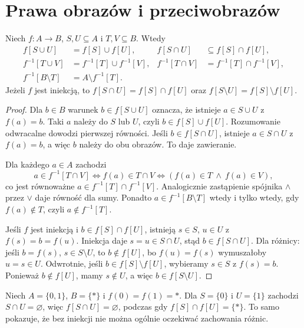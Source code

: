 \section{Prawa obrazów i przeciwobrazów}
\begin{twierdzenie}\label{thm:image-laws}
Niech $f:A\to B$, $S,U\subseteq A$ i $T,V\subseteq B$. Wtedy
\begin{align*}
f[S\cup U]&=f[S]\cup f[U], & f[S\cap U]&\subseteq f[S]\cap f[U],\\
f^{-1}[T\cup V]&=f^{-1}[T]\cup f^{-1}[V], &f^{-1}[T\cap V]&=f^{-1}[T]\cap f^{-1}[V],\\
f^{-1}[B\setminus T]&=A\setminus f^{-1}[T].
\end{align*}
Jeżeli $f$ jest iniekcją, to $f[S\cap U]=f[S]\cap f[U]$ oraz $f[S\setminus U]=f[S]\setminus f[U]$.
\end{twierdzenie}
\begin{proof}
Dla $b\in B$ warunek $b\in f[S\cup U]$ oznacza, że istnieje $a\in S\cup U$ z $f(a)=b$. Taki $a$ należy do $S$ lub $U$, czyli $b\in f[S]\cup f[U]$. Rozumowanie odwracalne dowodzi pierwszej równości. Jeśli $b\in f[S\cap U]$, istnieje $a\in S\cap U$ z $f(a)=b$, a więc $b$ należy do obu obrazów. To daje zawieranie.

Dla każdego $a\in A$ zachodzi
\[
a\in f^{-1}[T\cap V]\iff f(a)\in T\cap V\iff (f(a)\in T\ \land\ f(a)\in V),
\]
co jest równoważne $a\in f^{-1}[T]\cap f^{-1}[V]$. Analogicznie zastąpienie spójnika $\land$ przez $\lor$ daje równość dla sumy. Ponadto $a\in f^{-1}[B\setminus T]$ wtedy i tylko wtedy, gdy $f(a)\notin T$, czyli $a\notin f^{-1}[T]$.

Jeśli $f$ jest iniekcją i $b\in f[S]\cap f[U]$, istnieją $s\in S$, $u\in U$ z $f(s)=b=f(u)$. Iniekcja daje $s=u\in S\cap U$, stąd $b\in f[S\cap U]$. Dla różnicy: jeśli $b=f(s)$, $s\in S\setminus U$, to $b\notin f[U]$, bo $f(u)=f(s)$ wymuszałoby $u=s\in U$. Odwrotnie, jeśli $b\in f[S]\setminus f[U]$, wybieramy $s\in S$ z $f(s)=b$. Ponieważ $b\notin f[U]$, mamy $s\notin U$, a więc $b\in f[S\setminus U]$.
\end{proof}
\begin{przyklad}
Niech $A=\{0,1\}$, $B=\{*\}$ i $f(0)=f(1)=*$. Dla $S=\{0\}$ i $U=\{1\}$ zachodzi $S\cap U=\varnothing$, więc $f[S\cap U]=\varnothing$, podczas gdy $f[S]\cap f[U]=\{*\}$. To samo pokazuje, że bez iniekcji nie można ogólnie oczekiwać zachowania różnic.
\end{przyklad}



